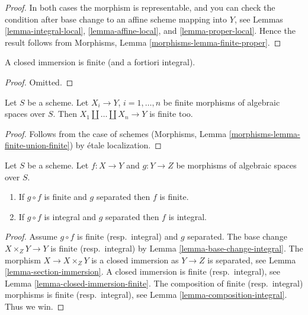 \begin{proof}
In both cases the morphism is representable, and you can check the condition
after base change to an affine scheme mapping into $Y$, see
Lemmas \ref{lemma-integral-local}, \ref{lemma-affine-local}, and
\ref{lemma-proper-local}. Hence the result follows from
Morphisms, Lemma \ref{morphisms-lemma-finite-proper}.
\end{proof}

\begin{lemma}
\label{lemma-closed-immersion-finite}
A closed immersion is finite (and a fortiori integral).
\end{lemma}

\begin{proof}
Omitted.
\end{proof}

\begin{lemma}
\label{lemma-finite-union-finite}
Let $S$ be a scheme.
Let $X_i \to Y$, $i = 1, \ldots, n$ be finite morphisms of
algebraic spaces over $S$.
Then $X_1 \amalg \ldots \amalg X_n \to Y$ is finite too.
\end{lemma}

\begin{proof}
Follows from the case of schemes
(Morphisms, Lemma \ref{morphisms-lemma-finite-union-finite})
by \'etale localization.
\end{proof}

\begin{lemma}
\label{lemma-finite-permanence}
Let $S$ be a scheme.
Let $f : X \to Y$ and $g : Y \to Z$ be morphisms of algebraic spaces over $S$.
\begin{enumerate}
\item If $g \circ f$ is finite and $g$ separated then $f$ is finite.
\item If $g \circ f$ is integral and $g$ separated then $f$ is integral.
\end{enumerate}
\end{lemma}

\begin{proof}
Assume $g \circ f$ is finite (resp.\ integral) and $g$ separated.
The base change $X \times_Z Y \to Y$ is finite (resp.\ integral) by
Lemma \ref{lemma-base-change-integral}.
The morphism $X \to X \times_Z Y$ is
a closed immersion as $Y \to Z$ is separated, see
Lemma \ref{lemma-section-immersion}.
A closed immersion is finite (resp.\ integral),
see Lemma \ref{lemma-closed-immersion-finite}.
The composition of finite (resp.\ integral) morphisms is finite
(resp.\ integral),
see Lemma \ref{lemma-composition-integral}. Thus we win.
\end{proof}





